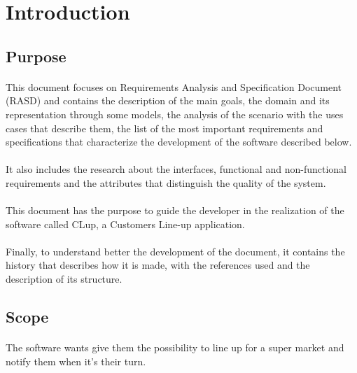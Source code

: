 \section{Introduction}
\subsection{Purpose}
\paragraph{}
This document focuses on Requirements Analysis and Specification Document (RASD) and contains the description of the main goals, the domain and its representation through some models, the analysis of the scenario with the uses cases that describe them, the list of the most important requirements and specifications that characterize the development of the software described below.

\paragraph{}
It also includes the research about the interfaces, functional and non-functional requirements and the attributes that distinguish the quality of the system.

\paragraph{}
This document has the purpose to guide the developer in the realization of the software called CLup, a Customers Line-up application.

\paragraph{}
Finally, to understand better the development of the document, it contains the history that describes how it is made, with the references used and the description of its structure.

\subsection{Scope}

\paragraph{}
The software wants give them the possibility to line up for a super market and notify them when it's their turn.

